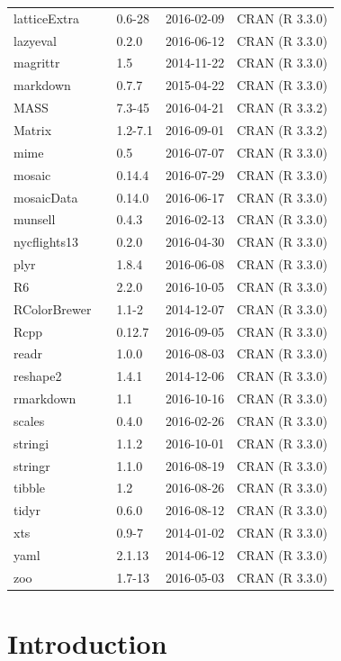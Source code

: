 \documentclass[]{tufte-book}
\begin{document}
\begin{longtable}{lllll}
latticeExtra &  & 0.6-28 & 2016-02-09 & CRAN (R 3.3.0)\\
lazyeval &  & 0.2.0 & 2016-06-12 & CRAN (R 3.3.0)\\
magrittr &  & 1.5 & 2014-11-22 & CRAN (R 3.3.0)\\
markdown &  & 0.7.7 & 2015-04-22 & CRAN (R 3.3.0)\\
\addlinespace
MASS &  & 7.3-45 & 2016-04-21 & CRAN (R 3.3.2)\\
Matrix &  & 1.2-7.1 & 2016-09-01 & CRAN (R 3.3.2)\\
mime &  & 0.5 & 2016-07-07 & CRAN (R 3.3.0)\\
mosaic &  & 0.14.4 & 2016-07-29 & CRAN (R 3.3.0)\\
mosaicData &  & 0.14.0 & 2016-06-17 & CRAN (R 3.3.0)\\
\addlinespace
munsell &  & 0.4.3 & 2016-02-13 & CRAN (R 3.3.0)\\
nycflights13 &  & 0.2.0 & 2016-04-30 & CRAN (R 3.3.0)\\
plyr &  & 1.8.4 & 2016-06-08 & CRAN (R 3.3.0)\\
R6 &  & 2.2.0 & 2016-10-05 & CRAN (R 3.3.0)\\
RColorBrewer &  & 1.1-2 & 2014-12-07 & CRAN (R 3.3.0)\\
\addlinespace
Rcpp &  & 0.12.7 & 2016-09-05 & CRAN (R 3.3.0)\\
readr &  & 1.0.0 & 2016-08-03 & CRAN (R 3.3.0)\\
reshape2 &  & 1.4.1 & 2014-12-06 & CRAN (R 3.3.0)\\
rmarkdown &  & 1.1 & 2016-10-16 & CRAN (R 3.3.0)\\
scales &  & 0.4.0 & 2016-02-26 & CRAN (R 3.3.0)\\
\addlinespace
stringi &  & 1.1.2 & 2016-10-01 & CRAN (R 3.3.0)\\
stringr &  & 1.1.0 & 2016-08-19 & CRAN (R 3.3.0)\\
tibble &  & 1.2 & 2016-08-26 & CRAN (R 3.3.0)\\
tidyr &  & 0.6.0 & 2016-08-12 & CRAN (R 3.3.0)\\
xts &  & 0.9-7 & 2014-01-02 & CRAN (R 3.3.0)\\
\addlinespace
yaml &  & 2.1.13 & 2014-06-12 & CRAN (R 3.3.0)\\
zoo &  & 1.7-13 & 2016-05-03 & CRAN (R 3.3.0)\\
\bottomrule
\end{longtable}

\chapter{Introduction}\label{intro}
\end{document}
